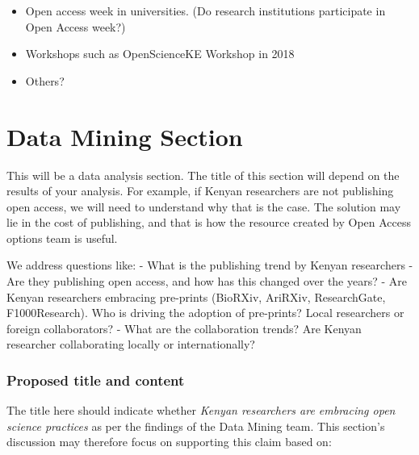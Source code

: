 \begin{itemize}
\tightlist
\item
  Open access week in universities. (Do research institutions
  participate in Open Access week?)
\item
  Workshops such as OpenScienceKE Workshop in 2018
\item
  Others?
\end{itemize}

\section*{Data Mining Section}\label{data-mining-section}

This will be a data analysis section. The title of this section will
depend on the results of your analysis. For example, if Kenyan
researchers are not publishing open access, we will need to understand
why that is the case. The solution may lie in the cost of publishing,
and that is how the resource created by Open Access options team is
useful.

We address questions like: - What is the publishing trend by Kenyan
researchers - Are they publishing open access, and how has this changed
over the years? - Are Kenyan researchers embracing pre-prints (BioRXiv,
AriRXiv, ResearchGate, F1000Research). Who is driving the adoption of
pre-prints? Local researchers or foreign collaborators? - What are the
collaboration trends? Are Kenyan researcher collaborating locally or
internationally?

\subsubsection{Proposed title and
content}\label{proposed-title-and-content}

The title here should indicate whether \emph{Kenyan researchers are
embracing open science practices} as per the findings of the Data Mining
team. This section's discussion may therefore focus on supporting this
claim based on:

